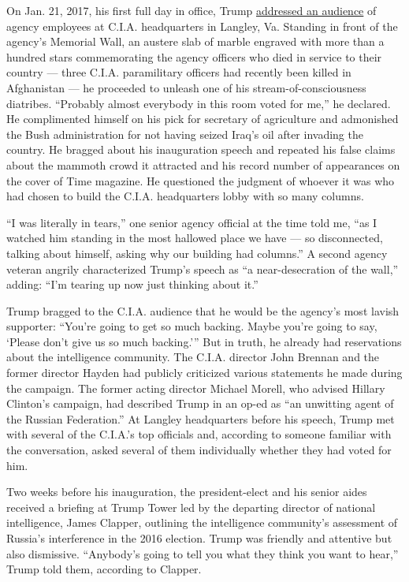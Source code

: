 On Jan. 21, 2017, his first full day in office, Trump
\href{https://www.nytimes.com/video/us/politics/100000004886212/watch-live-trump-at-the-cia.html}{addressed
an audience} of agency employees at C.I.A. headquarters in Langley, Va.
Standing in front of the agency's Memorial Wall, an austere slab of
marble engraved with more than a hundred stars commemorating the agency
officers who died in service to their country --- three C.I.A.
paramilitary officers had recently been killed in Afghanistan --- he
proceeded to unleash one of his stream-of-consciousness diatribes.
``Probably almost everybody in this room voted for me,'' he declared. He
complimented himself on his pick for secretary of agriculture and
admonished the Bush administration for not having seized Iraq's oil
after invading the country. He bragged about his inauguration speech and
repeated his false claims about the mammoth crowd it attracted and his
record number of appearances on the cover of Time magazine. He
questioned the judgment of whoever it was who had chosen to build the
C.I.A. headquarters lobby with so many columns.

``I was literally in tears,'' one senior agency official at the time
told me, ``as I watched him standing in the most hallowed place we have
--- so disconnected, talking about himself, asking why our building had
columns.'' A second agency veteran angrily characterized Trump's speech
as ``a near-desecration of the wall,'' adding: ``I'm tearing up now just
thinking about it.''

Trump bragged to the C.I.A. audience that he would be the agency's most
lavish supporter: ``You're going to get so much backing. Maybe you're
going to say, `Please don't give us so much backing.''' But in truth, he
already had reservations about the intelligence community. The C.I.A.
director John Brennan and the former director Hayden had publicly
criticized various statements he made during the campaign. The former
acting director Michael Morell, who advised Hillary Clinton's campaign,
had described Trump in an op-ed as ``an unwitting agent of the Russian
Federation.'' At Langley headquarters before his speech, Trump met with
several of the C.I.A.'s top officials and, according to someone familiar
with the conversation, asked several of them individually whether they
had voted for him.

Two weeks before his inauguration, the president-elect and his senior
aides received a briefing at Trump Tower led by the departing director
of national intelligence, James Clapper, outlining the intelligence
community's assessment of Russia's interference in the 2016 election.
Trump was friendly and attentive but also dismissive. ``Anybody's going
to tell you what they think you want to hear,'' Trump told them,
according to Clapper.

